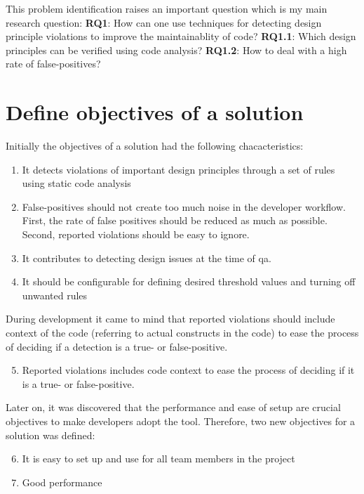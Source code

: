 \documentclass{report}
\begin{document}
\hfill \newline
This problem identification raises an important question which is my main research question:
\hfill \newline
\hfill \newline
\textbf{RQ1}: How can one use techniques for detecting design principle violations to improve the maintainablity of code? \newline
\textbf{RQ1.1}: Which design principles can be verified using code analysis? \newline
\textbf{RQ1.2}: How to deal with a high rate of false-positives? 


\section{Define objectives of a solution}
\label{objectives-of-solution}
Initially the objectives of a solution had the following chacacteristics:
\begin{enumerate}
    \item It detects violations of important design principles through a set of rules using static code analysis
    \item False-positives should not create too much noise in the developer workflow. First, the rate of false positives should be reduced as much as possible. Second, reported violations should be easy to ignore. 
    \item It contributes to detecting design issues at the time of \gls{qa}.
    \item It should be configurable for defining desired threshold values and turning off unwanted rules
\end{enumerate}

During development it came to mind that reported violations should include context of the code (referring to actual constructs in the code) to ease the process of deciding if a detection is a true- or false-positive. 
\begin{enumerate}
  \setcounter{enumi}{4}
    \item Reported violations includes code context to ease the process of deciding if it is a true- or false-positive. 
\end{enumerate}

Later on, it was discovered that the performance and ease of setup are crucial objectives to make developers adopt the tool. Therefore, two new objectives for a solution was defined:
\begin{enumerate}
\setcounter{enumi}{5}
     \item It is easy to set up and use for all team members in the project
    \item Good performance
\end{enumerate}
\end{document}
